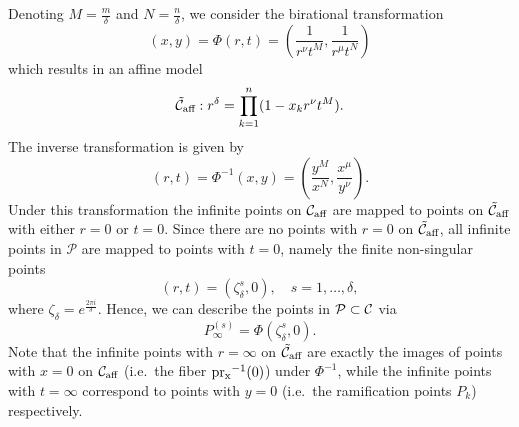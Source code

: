 \documentclass[main.tex]{subfiles}
\begin{document}
  Denoting $M = \frac{m}\delta$ and $N = \frac{n}\delta$, we consider the birational transformation
  \begin{equation*}
   (x,y) = \Phi(r,t) = \left(\frac{1}{r^{\nu}t^M},\frac{1}{r^{\mu}t^N}\right)
  \end{equation*}
  which results in an affine model
  \begin{equation*}
   \tilde{\mathcal{C}}_{\text{aff}} : r^{\delta} = \prod_{k=1}^n (1-x_kr^{\nu}t^M).
  \end{equation*}
  The inverse transformation is given by
  \begin{equation*}
   (r,t) = \Phi^{-1}(x,y) = \left(\frac{y^M}{x^N},\frac{x^{\mu}}{y^{\nu}}\right).
  \end{equation*}
 Under this transformation the infinite points on $\mathcal{C}_{\text{aff}}$ are mapped to points  on $\tilde{\mathcal{C}}_{\text{aff}}$ with either $r=0$ or $t=0$. Since there are no points with $r=0$ on $\tilde{\mathcal{C}}_{\text{aff}}$,
 all infinite points in $\mathcal{P}$ are mapped to points with $t=0$, namely the finite non-singular points
  \begin{equation*}
   (r,t) = (\zeta_{\delta}^s,0), \quad s=1,\dots,\delta,
  \end{equation*}
  where $\zeta_{\delta} = e^{\frac{2\pi i }{\delta}}$.
  Hence, we can describe the points in $\mathcal{P} \subset \mathcal{C}$ via
   \begin{equation*}
      P_{\infty}^{(s)} = \Phi(\zeta_{\delta}^s,0).
   \end{equation*}
  Note that the infinite points with $r=\infty$ on $\tilde{\mathcal{C}}_{\text{aff}}$ are exactly the images of points with $x=0$ on $\mathcal{C}_{\text{aff}}$ (i.e.\ the fiber $\operatorname{pr_x}^{-1}(0)$) under $\Phi^{-1}$, while the
  infinite points with $t=\infty$
  correspond to points with $y=0$ (i.e.\ the ramification points $P_k$) respectively.
\end{document}
